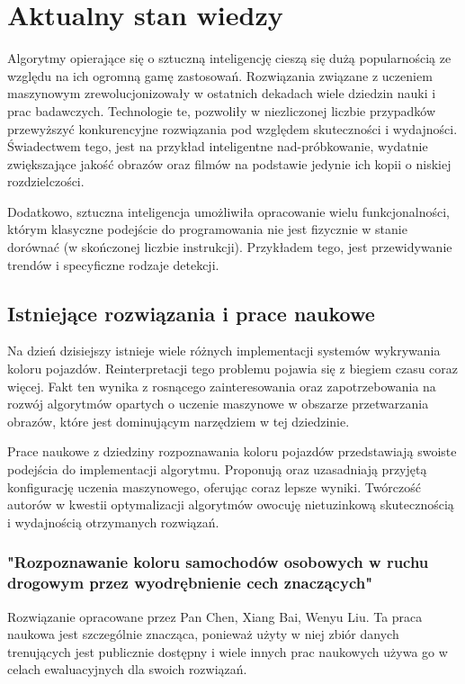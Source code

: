 \section{Aktualny stan wiedzy}

Algorytmy opierające się o sztuczną inteligencję cieszą się dużą popularnością ze względu na ich ogromną gamę zastosowań. Rozwiązania związane z uczeniem maszynowym zrewolucjonizowały w ostatnich dekadach wiele dziedzin nauki i prac badawczych. Technologie te, pozwoliły w niezliczonej liczbie przypadków przewyższyć konkurencyjne rozwiązania pod względem skuteczności i wydajności. 
Świadectwem tego, jest na przykład inteligentne nad-próbkowanie, wydatnie zwiększające jakość obrazów oraz filmów na podstawie jedynie ich kopii o niskiej rozdzielczości. 

Dodatkowo, sztuczna inteligencja umożliwiła opracowanie wielu funkcjonalności, którym klasyczne podejście do programowania nie jest fizycznie w stanie dorównać (w skończonej liczbie instrukcji). Przykładem tego, jest przewidywanie trendów i specyficzne rodzaje detekcji.

\subsection{Istniejące rozwiązania i prace naukowe}

Na dzień dzisiejszy istnieje wiele różnych implementacji systemów wykrywania koloru pojazdów. Reinterpretacji tego problemu pojawia się z biegiem czasu coraz więcej. Fakt ten wynika z rosnącego zainteresowania oraz zapotrzebowania na rozwój algorytmów opartych o uczenie maszynowe w obszarze przetwarzania obrazów, które jest dominującym narzędziem w tej dziedzinie.

Prace naukowe z dziedziny rozpoznawania koloru pojazdów przedstawiają swoiste podejścia do implementacji algorytmu. Proponują oraz uzasadniają przyjętą konfigurację uczenia maszynowego, oferując coraz lepsze wyniki. Twórczość autorów w kwestii optymalizacji algorytmów owocuję nietuzinkową skutecznością i wydajnością otrzymanych rozwiązań.


\subsubsection{"\null{}Rozpoznawanie koloru samochodów osobowych w ruchu drogowym przez wyodrębnienie cech znaczących" \cite{chen_ref}}
Rozwiązanie opracowane przez Pan Chen, Xiang Bai, Wenyu Liu. Ta praca naukowa jest szczególnie znacząca, ponieważ użyty w niej zbiór danych trenujących jest publicznie dostępny i wiele innych prac naukowych używa go w celach ewaluacyjnych dla swoich rozwiązań.

